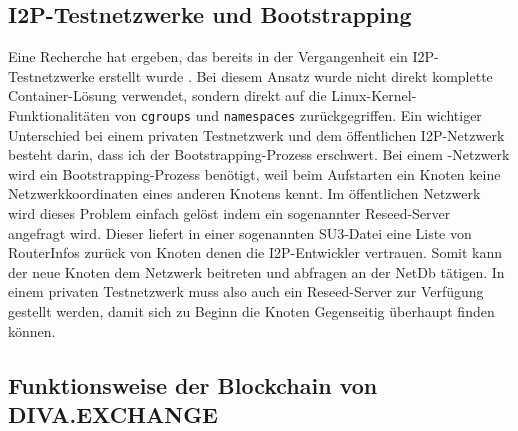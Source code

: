 %
%

\subsection{I2P-Testnetzwerke und Bootstrapping}\label{sec:bootstrapping}

Eine Recherche hat ergeben, das bereits in der Vergangenheit ein I2P-Testnetzwerke erstellt wurde \parencite{noauthor_how_2018}.
Bei diesem Ansatz wurde nicht direkt komplette Container-Lösung verwendet, sondern direkt auf die Linux-Kernel-Funktionalitäten von \lstinline|cgroups| und \lstinline|namespaces| zurückgegriffen.
Ein wichtiger Unterschied bei einem privaten Testnetzwerk und dem öffentlichen I2P-Netzwerk besteht darin, dass ich der Bootstrapping-Prozess erschwert.
Bei einem -Netzwerk wird ein Bootstrapping-Prozess benötigt, weil beim Aufstarten ein Knoten keine Netzwerkkoordinaten eines anderen Knotens kennt.
Im öffentlichen Netzwerk wird dieses Problem einfach gelöst indem ein sogenannter Reseed-Server angefragt wird.
Dieser liefert in einer sogenannten SU3-Datei eine Liste von RouterInfos zurück von Knoten denen die I2P-Entwickler vertrauen.
Somit kann der neue Knoten dem Netzwerk beitreten und abfragen an der NetDb tätigen.
In einem privaten Testnetzwerk muss also auch ein Reseed-Server zur Verfügung gestellt werden, damit sich zu Beginn die Knoten Gegenseitig überhaupt finden können.

\subsection{Funktionsweise der Blockchain von DIVA.EXCHANGE}\label{sec:divachain}

